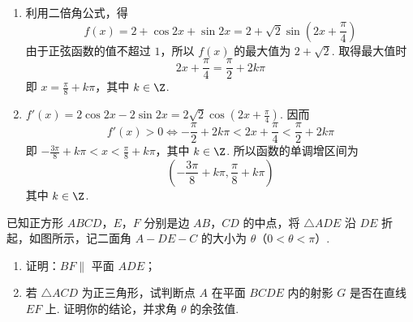 \begin{solution}
\begin{enumerate}
\item 利用二倍角公式，得
\[
f(x)=2+\cos 2x+\sin 2x=2+\sqrt{2}\sin\left(2x+\frac{\pi}{4}\right)
\]
由于正弦函数的值不超过 \(1\)，所以 \(f(x)\) 的最大值为 \(2+\sqrt{2}\). 取得最大值时
\[
2x+\frac{\pi}{4}=\frac{\pi}{2}+2k\pi
\]
即 \(x=\frac{\pi}{8}+k\pi\)，其中 \(k\in\Z\).

\item \(f'(x)=2\cos 2x-2\sin 2x=2\sqrt{2}\cos\left(2x+\frac{\pi}{4}\right)\). 因而
\[
f'(x)>0\Longleftrightarrow -\frac{\pi}{2}+2k\pi<2x+\frac{\pi}{4}<\frac{\pi}{2}+2k\pi
\]
即 \(-\frac{3\pi}{8}+k\pi<x<\frac{\pi}{8}+k\pi\)，其中 \(k\in\Z\). 所以函数的单调增区间为
\[
\left(-\frac{3\pi}{8}+k\pi,\frac{\pi}{8}+k\pi\right)
\]
其中 \(k\in\Z\).
\end{enumerate}
\end{solution}

\begin{problem}
已知正方形 \(ABCD\)，\(E\)，\(F\) 分别是边 \(AB\)，\(CD\) 的中点，将 \(\triangle ADE\) 沿 \(DE\) 折起，如图所示，记二面角 \(A - DE - C\) 的大小为 \(\theta\)（\(0 < \theta < \pi\)）.

\begin{enumerate}
\item 证明：\(BF \parallel\) 平面 \(ADE\)；
\item 若 \(\triangle ACD\) 为正三角形，试判断点 \(A\) 在平面 \(BCDE\) 内的射影 \(G\) 是否在直线 \(EF\) 上. 证明你的结论，并求角 \(\theta\) 的余弦值.
\end{enumerate}

\end{problem}

